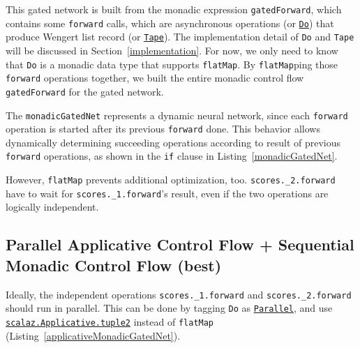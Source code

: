 This gated network is built from the monadic expression \lstinline{gatedForward}, which contains some \lstinline{forward} calls, which are asynchronous operations (or \href{https://javadoc.io/page/com.thoughtworks.raii/asynchronous_2.11/latest/com/thoughtworks/raii/asynchronous%24%24Do.html}{\lstinline{Do}}) that produce Wengert list record (or \href{https://javadoc.io/page/com.thoughtworks.deeplearning/deeplearning_2.11/latest/com/thoughtworks/deeplearning/DeepLearning%24%24Tape.html}{\lstinline{Tape}}). The implementation detail of \lstinline{Do} and \lstinline{Tape} will be discussed in Section~\ref{implementation}. For now, we only need to know that \lstinline{Do} is a monadic data type that supports \lstinline{flatMap}. By \lstinline{flatMap}ping those \lstinline{forward} operations together, we built the entire monadic control flow \lstinline{gatedForward} for the gated network.

The \lstinline{monadicGatedNet} represents a dynamic neural network, since each \lstinline{forward} operation is started after its previous \lstinline{forward} done. This behavior allows dynamically determining succeeding operations according to result of previous \lstinline{forward} operations, as shown in the \lstinline{if} clause in Listing~\ref{monadicGatedNet}.

However, \lstinline{flatMap} prevents additional optimization, too.
\lstinline{scores._2.forward} have to wait for \lstinline{scores._1.forward}'s result, even if the two operations are logically independent.

\subsection{Parallel Applicative Control Flow + Sequential Monadic Control Flow (best)}
\label{applicative}

Ideally, the independent operations \lstinline{scores._1.forward} and \lstinline{scores._2.forward} should run in parallel. This can be done by tagging \lstinline{Do} as \href{https://javadoc.io/page/org.scalaz/scalaz_2.11/latest/scalaz/Tags%24%24Parallel.html}{\lstinline{Parallel}}, and use \href{https://javadoc.io/page/org.scalaz/scalaz_2.11/latest/scalaz/Applicative.html#tuple2[A,B](fa:=>F[A],fb:=>F[B]):F[(A,B)]}{\lstinline{scalaz.Applicative.tuple2}} instead of \lstinline{flatMap} (Listing~\ref{applicativeMonadicGatedNet}).

